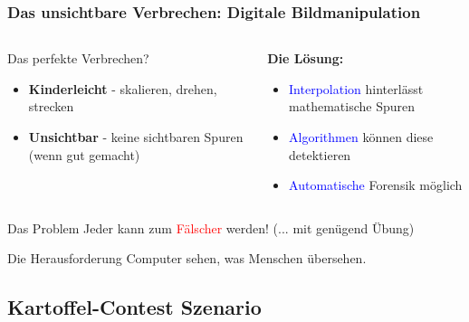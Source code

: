 \documentclass[11pt,t,usepdftitle=false,aspectratio=169]{beamer}
\begin{document}
\begin{frame}
	\frametitle{Das unsichtbare Verbrechen: Digitale Bildmanipulation}
	
	\begin{columns}[T]
		\begin{column}{0.45\textwidth}
			\begin{exampleblock}{Das perfekte Verbrechen?}
				\begin{itemize}
					\item \textbf{Kinderleicht} - skalieren, drehen, strecken
					\item \textbf{Unsichtbar} - keine sichtbaren Spuren (wenn gut gemacht)
				\end{itemize}
			\end{exampleblock}
		\end{column}
		\begin{column}{0.48\textwidth}
			\textbf{Die Lösung:}
			\begin{itemize}
				\item \textcolor{blue}{Interpolation} hinterlässt mathematische Spuren
				\item \textcolor{blue}{Algorithmen} können diese detektieren
				\item \textcolor{blue}{Automatische} Forensik möglich
			\end{itemize}
		\end{column}
	\end{columns}
	
	\vspace{0.5em}
	
	\begin{alertblock}{Das Problem}
		Jeder kann zum \textcolor{red}{Fälscher} werden! (... mit genügend Übung)
	\end{alertblock}
	
	\begin{block}{Die Herausforderung}
		Computer sehen, was Menschen übersehen.
	\end{block}
\end{frame}

\subsection{Kartoffel-Contest Szenario}
\end{document}
